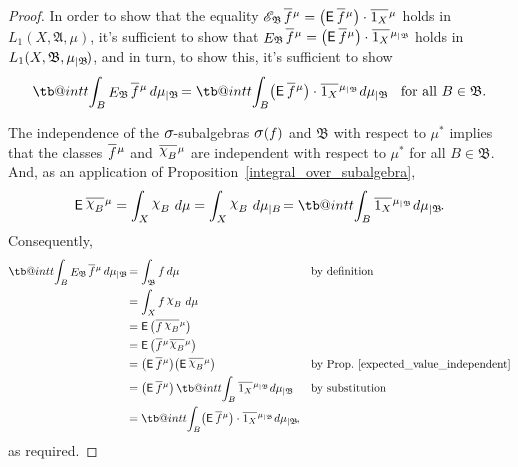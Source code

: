 \documentclass[
twoside=true,
paper=letter,
fontsize=9pt,
pagesize=auto,
leqno,
openany,
headsepline,
overfullrule,
]{scrbook}
\makeatletter
\theoremstyle{plain}
\theoremstyle{plain}
\theoremstyle{definition}
\theoremstyle{bfnoteitalic}
\theoremstyle{bfnoteroman}
\newcommand{\sigalg}[1]{\mathfrak{#1}}
\newcommand{\cali}[1]{\mathscr{#1}}
\newcommand{\sfop}[1]{\mathsf{#1}}
\newcommand{\expval}{\sfop{E}\,}
\newcommand{\kondexpsub}[2]
{\mathop{E}\nolimits_{#2}\hspace{-1pt}#1}
\newcommand{\condexpsub}[2]
{\mathop{\cali{E}\hspace{-1.5pt}}\nolimits_{#2}\hspace{-1pt}#1}
\newcommand{\sagb}{\mathop{\hbox{\large{$\sigma$}}}\nolimits}
\newcommand{\textsigma}{\hbox{\large{$\sigma$}}\kern-1pt}
\newcommand{\charfunction}[1]{\mathop{{\raisebox{2pt}{$\chi$}}_{#1}}}
\newcommand{\restrictedto}[1]{_{\lvert#1}\kern-1.5pt}
\newcommand{\sigmaalgebra}{\sigalg{A}}
\newcommand{\sigmaalgebraii}{\sigalg{B}}
\newcommand{\oneonomega}{1_\measurespace}
\newcommand{\sigalgb}{\sigmaalgebraii}
\newcommand{\function}{f}
\newcommand{\measurespace}{X}
\newcommand{\measure}{\mu}
\newcommand{\setii}{B}
\newcommand*\xbar[1]{%
   \hbox{%
     \vbox{%
       \hrule height 0.4pt %
       \kern0.4ex%
       \hbox{%
         \ensuremath{#1}%
       }%
     }%
   }%
}
\newcommand\tint{\mathop{\mathpalette\tb@int{t}}\!\int}
\newcommand\tb@int[2]{%
  \sbox\z@{$\m@th#1\int$}%
  \if#2t%
    \rlap{\hbox to\wd\z@{%
      \hfil
      \vrule width .35em height \dimexpr\ht\z@+1.4pt\relax depth -\dimexpr\ht\z@+1pt\relax
      \kern.05em %
    }}
  \else
    \rlap{\hbox to\wd\z@{%
      \vrule width .35em height -\dimexpr\dp\z@+1pt\relax depth \dimexpr\dp\z@+1.4pt\relax
      \hfil
    }}
  \fi
}
\newcommand{\lebclass}[1]{\hspace{.5pt}\xbar{#1}\hspace{0.5pt}}
\newcommand{\ellclass}[2]{\lebclass{#1}^{#2}}
\newcommand{\inducedint}{\tint}
\makeatother
\begin{document}
\begin{proof}
In order to show that the equality
$\condexpsub{\ellclass{\function}{\measure}}{\sigmaalgebraii}
=  
\bigl(\expval{\ellclass{\function}{\measure}}\bigr)
\cdot \ellclass{\oneonomega}{\measure}$ holds in
$L_1(\measurespace, \sigmaalgebra,\measure)$, 
it's sufficient to show that 
$\kondexpsub{\ellclass{\function}{\measure}}{\sigmaalgebraii}
=  
\bigl(\expval{\ellclass{\function}{\measure}}\bigr)
\cdot \ellclass{\oneonomega}{\measure\restrictedto\sigmaalgebraii}$ holds in
$L_1(\measurespace, \sigmaalgebraii,\measure\restrictedto\sigmaalgebraii)$, and in turn, to show this, it's sufficient to show
\[
\inducedint_\setii \kondexpsub{\ellclass{\function}{\measure}} {\sigmaalgebraii} \, d\measure\restrictedto{\sigalgb}
=
\inducedint_\setii  
\bigl(\expval{\ellclass{\function}{\measure}}\bigr)
\cdot \ellclass{\oneonomega}{\measure\restrictedto\sigmaalgebraii}
\, d\measure\restrictedto\sigmaalgebraii
\quad
\text{for all $\setii\in\sigmaalgebraii$.}
\]

The independence of the 
$\textsigma$-subalgebras $\sagb(\function)$ and 
$\sigmaalgebraii$  with respect to $\measure^*$
implies that the classes  $\ellclass{\function}{\measure}$ and 
$\ellclass{\charfunction{\setii}}{\measure}$ are independent with respect to $\measure^*$ for all $\setii\in\sigmaalgebraii$. And, as an application of Proposition~\ref{integral_over_subalgebra},
\[
\expval{ \ellclass{\charfunction{\setii}}{\measure} }
=
\int_\measurespace \charfunction{\setii}\,d\measure
=
\int_\measurespace \charfunction{\setii}\,d\measure\restrictedto{\setii}
=
\inducedint_\setii
\ellclass{\oneonomega}{\measure\restrictedto\sigmaalgebraii}
\, d\measure\restrictedto\sigmaalgebraii.
\]
Consequently,
\begin{align*}
\inducedint_\setii \kondexpsub{\ellclass{\function}{\measure}} {\sigmaalgebraii} \, d\measure\restrictedto{\sigmaalgebraii}
& = \int_\sigmaalgebraii \function\,d\measure 
&&\text{by definition}
\\
& = \int_\measurespace \function\charfunction{\setii}\, d\measure
\\
& = \expval{ \bigl(
\ellclass{\function\charfunction{\setii}}{\measure}
\bigr) }
\\
& = \expval{ \bigl(
\ellclass{\function}{\measure} 
\ellclass{\charfunction{\setii}}{\measure}
\bigr) }
\\
& = \bigl(\expval{\ellclass{\function}{\measure}}\bigr)
\bigl(\expval{\ellclass{\charfunction{\setii}}{\measure}}\bigr)
&&\text{by Prop.~\ref{expected_value_independent}}
\\
& = 
\bigl(\expval{\ellclass{\function}{\measure}}\bigr)
\inducedint_\setii
\ellclass{\oneonomega}{\measure\restrictedto\sigmaalgebraii}
\, d\measure\restrictedto\sigmaalgebraii
&&\text{by substitution}
\\
& = 
\inducedint_\setii
\bigl(\expval{\ellclass{\function}{\measure}}\bigr)
\cdot \ellclass{\oneonomega}{\measure\restrictedto\sigmaalgebraii}
\, d\measure\restrictedto\sigmaalgebraii,
\end{align*}
as required.
\end{proof}
\end{document}
